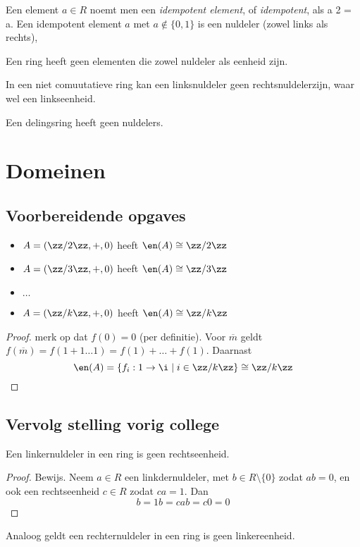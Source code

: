 \documentclass[a4paper,12pt,oneside]{book}
\begin{document}
\begin{definitie}
Een element  $a \in R$ noemt men een \textit{idempotent element}, of \textit{idempotent}, als a 2 = a.
Een idempotent element $a$ met $a \not \in \{0, 1\}$ is een nuldeler (zowel links als rechts),
\end{definitie}

\begin{stelling}
Een ring heeft geen elementen die zowel nuldeler als eenheid zijn.
\end{stelling}
\begin{opmerking}
In een niet comuutatieve ring kan een linksnuldeler geen rechtsnuldelerzijn, waar wel een linkseenheid.
\end{opmerking}
\begin{gevolg}
Een delingsring heeft geen nuldelers.
\end{gevolg}

\clearpage
\chapter{Domeinen}
\section{Voorbereidende opgaves}
\begin{itemize}
\item $A= (\zz/2\zz, +, 0)$ heeft $\en(A) \cong \zz/2\zz$
\item $A= (\zz/3\zz, +, 0)$ heeft $\en(A) \cong \zz/3\zz$
\item $\ldots$
\item $A= (\zz/k\zz, +, 0)$ heeft $\en(A) \cong \zz/k\zz$
\end{itemize}

\begin{proof}merk op dat $f(0) = 0$ (per definitie). Voor $\overline{m}$ geldt $f(\overline{m}) = f(1 + 1 \ldots 1) = f(1) +\ldots + f(1)$. Daarnast 
\[
\en (A) = \{f_i : 1 \to \i \mid i \in \zz/k\zz\} \cong \zz/k\zz
\]
\end{proof}

\section{Vervolg stelling vorig college}
\begin{theorem}
Een linkernuldeler in een ring is geen rechtseenheid.
\end{theorem}

\begin{proof}
Bewijs. Neem $a \in R$ een linkdernuldeler, met $b \in R \setminus \{0\}$ zodat $ab = 0$, en ook een rechtseenheid $c\in R$ zodat $ca = 1$. Dan 
$$b = 1b = cab = c0 = 0 $$
\end{proof}
Analoog geldt een rechternuldeler in een ring is geen linkereenheid.
\end{document}
